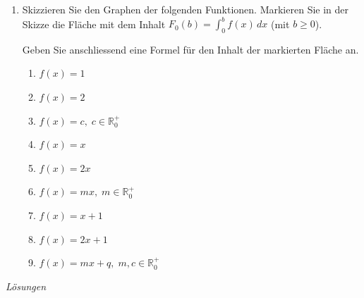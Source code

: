 \begin{ueb}
\begin{enumerate}
		\item Skizzieren Sie den Graphen der folgenden Funktionen. Markieren Sie in der Skizze die Fläche mit dem Inhalt  \(F_0(b) = \int_0^b f(x) \, dx\) (mit \(b \ge 0\)).

		      Geben Sie anschliessend eine Formel für den Inhalt der markierten Fläche an.



		      \begin{enumerate}
			      \item \(f(x) = 1\)
			      \item \(f(x) = 2\)
			      \item \(f(x) = c,\; c \in \mathbb{R}_0^{+}\)
			      \item \(f(x) = x\)
			      \item \(f(x) = 2x\)
			      \item \(f(x) = mx,\; m \in \mathbb{R}_0^{+}\)
			      \item \(f(x) = x + 1\)
			      \item \(f(x) = 2x + 1\)
			      \item \(f(x) = mx + q,\; m,c \in \mathbb{R}_0^{+}\)
		      \end{enumerate}


	\end{enumerate}
\end{ueb}
\clearpage

\emph{Lösungen}

